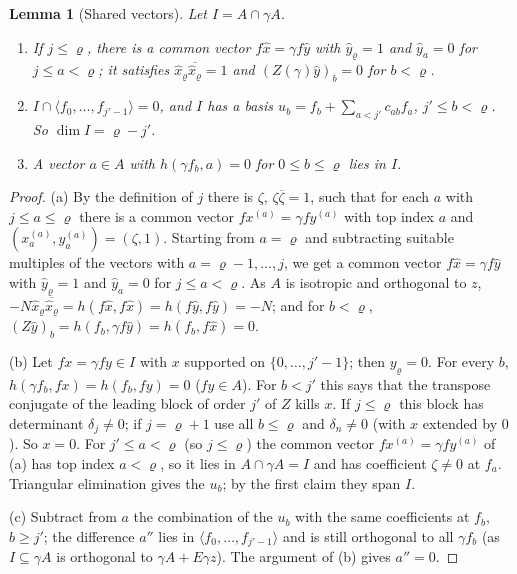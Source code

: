 \documentclass[10pt]{amsart}
\newtheorem{lemma}[theorem]{Lemma}
\theoremstyle{definition}
\theoremstyle{remark}
\providecommand{\aubar}[1]{\overline{#1}}
\begin{document}
\begin{lemma}[Shared vectors]\label{pbg:shared}
Let $I=A\cap\gamma A$.
\begin{enumerate}
\item[(a)] If $j\le\varrho$, there is a common vector $f\hat x=\gamma f\hat y$ with $\hat y_\varrho=1$
and $\hat y_a=0$ for $j\le a<\varrho$; it satisfies $\hat x_\varrho\aubar{\hat x_\varrho}=1$ and
$(Z(\gamma)\hat y)_b=0$ for $b<\varrho$.
\item[(b)] $I\cap\langle f_0,\dots,f_{j'-1}\rangle=0$, and $I$ has a basis $u_b=f_b+\sum_{a<j'}c_{ab}
f_a$, $j'\le b<\varrho$. So $\dim I=\varrho-j'$.
\item[(c)] A vector $a\in A$ with $h(\gamma f_b,a)=0$ for $0\le b\le\varrho$ lies in $I$.
\end{enumerate}
\end{lemma}
\begin{proof}
(a) By the definition of $j$ there is $\zeta$,
$\zeta\aubar\zeta=1$, such that for each $a$ with $j\le a\le\varrho$ there is a common vector $fx^{(a)}=
\gamma fy^{(a)}$ with top index $a$ and $(x^{(a)}_a,y^{(a)}_a)=(\zeta,1)$. Starting from $a=\varrho$ and
subtracting suitable multiples of the vectors with $a=\varrho-1,\dots,j$, we get a common vector
$f\hat x=\gamma f\hat y$ with $\hat y_\varrho=1$ and $\hat y_a=0$ for $j\le a<\varrho$. As $A$ is
isotropic and orthogonal to $z$, $-N\hat x_\varrho\aubar{\hat x_\varrho}=h(f\hat x,f\hat x)=h(f\hat y,f
\hat y)=-N$; and for $b<\varrho$, $(Z\hat y)_b=h(f_b,\gamma f\hat y)=h(f_b,f\hat x)=0$.

(b) Let $fx=\gamma fy\in I$ with $x$ supported on $\{0,\dots,j'-1\}$; then $y_\varrho=0$. For every
$b$, $h(\gamma f_b,fx)=h(f_b,fy)=0$ ($fy\in A$). For $b<j'$ this says that the transpose conjugate of
the leading block of order $j'$ of $Z$ kills $x$. If $j\le\varrho$ this block has determinant
$\delta_j\ne0$; if $j=\varrho+1$ use all $b\le\varrho$ and $\delta_n\ne0$ (with $x$ extended by $0$).
So $x=0$. For $j'\le a<\varrho$ (so $j\le\varrho$) the common vector $fx^{(a)}=\gamma fy^{(a)}$ of (a)
has top index $a<\varrho$, so it lies in $A\cap\gamma A=I$ and has coefficient $\zeta\ne0$ at $f_a$.
Triangular elimination gives the $u_b$; by the first claim they span $I$.

(c) Subtract from $a$ the combination of the $u_b$ with the same coefficients at $f_b$, $b\ge j'$;
the difference $a''$ lies in $\langle f_0,\dots,f_{j'-1}\rangle$ and is still orthogonal to all
$\gamma f_b$ (as $I\subseteq\gamma A$ is orthogonal to $\gamma A+E\gamma z$). The argument of (b) gives
$a''=0$.
\end{proof}
\end{document}
